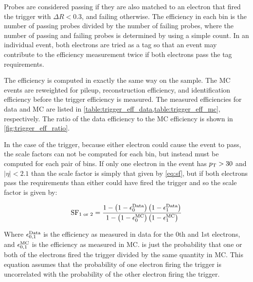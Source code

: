 Probes are considered passing if they are also matched to an electron that
fired the trigger with $\Delta R < 0.3$, and failing otherwise. The efficiency
in each bin is the number of passing probes divided by the number of failing
probes, where the number of passing and failing probes is determined by using a
simple count. In an individual event, both electrons are tried as a tag so that
an event may contribute to the efficiency measurement twice if both electrons
pass the tag requirements.

The efficiency is computed in exactly the same way on the \MADGRAPH sample. The
MC events are reweighted for pileup, reconstruction efficiency, and
identification efficiency before the trigger efficiency is measured. The
measured efficiencies for data and MC are listed in
\cref{table:trigger_eff_data,table:trigger_eff_mc},
respectively. The ratio of the data efficiency to the MC efficiency is shown in
\cref{fig:trigger_eff_ratio}.







In the case of the trigger, because either electron could cause the event to
pass, the scale factors can not be computed for each bin, but instead must be computed
for each pair of bins. If only one electron in the event has $p_{\mathrm{T}} > 30$ and
$|\eta| < 2.1$ than the scale factor is simply that given by \cref{eq:sf}, but if both
electrons pass the requirements than either could have fired the trigger and so
the scale factor is given by:

\begin{equation} \label{eq:sf_double}
    \text{SF}_{1 \text{ or } 2}
    =
    \frac{
        1 - \left( 1 - \epsilon^{\text{Data}}_{0} \right) \left( 1 - \epsilon^{\text{Data}}_{1} \right)
    } {
        1 - \left( 1 - \epsilon^{\text{MC}}_{0} \right) \left( 1 - \epsilon^{\text{MC}}_{1} \right)
    }
\end{equation}

Where $\epsilon^{\text{Data}}_{0,1}$ is the efficiency as measured in data for the 0th and
1st electrons, and $\epsilon^{\text{MC}}_{0,1}$ is the efficiency as measured in MC.
 is just the probability that one or both of the
electrons fired the trigger divided by the same quantity in MC. This equation
assumes that the probability of one electron firing the trigger is uncorrelated
with the probability of the other electron firing the trigger.


